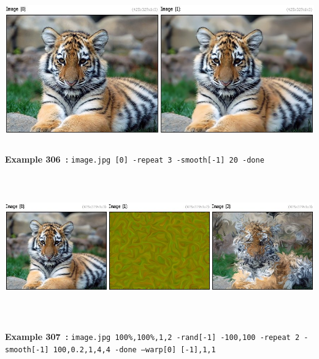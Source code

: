 \documentclass[a4paper,11pt,twoside]{book}
\begin{document}
\begin{center}\includegraphics[keepaspectratio=true,height=7cm,width=\textwidth]{img/gmic_def306.jpg}\\
{\footnotesize \textbf{Example 306~:} \texttt{image.jpg [0] -repeat 3 -smooth[-1] 20 -done}}
\\\includegraphics[keepaspectratio=true,height=7cm,width=\textwidth]{img/gmic_def307.jpg}\\
{\footnotesize \textbf{Example 307~:} \texttt{image.jpg 100\%,100\%,1,2 -rand[-1] -100,100 -repeat 2 -smooth[-1] 100,0.2,1,4,4 -done --warp[0] [-1],1,1}}
\end{center}
\end{document}
